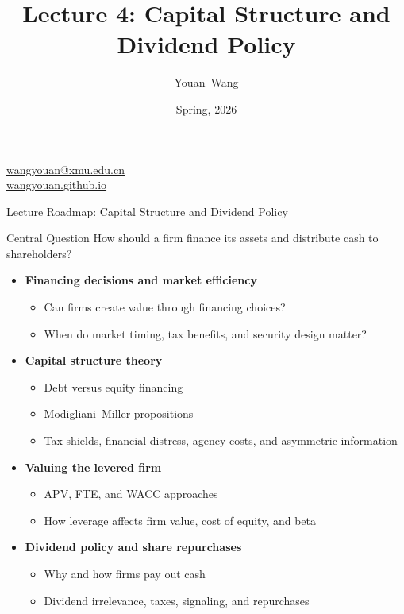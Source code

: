 \documentclass[xcolor=table]{beamer}
\title[csdp]{Lecture 4: Capital Structure and Dividend Policy} %
\author[WYA] %
{Youan~Wang}
\institute[XMU] %
{
    WISE \& SOE, Xiamen University
}
\date[Spring, 2026]{
	Spring, 2026
} %
\begin{document}
\begin{frame}
\titlepage %
\begin{center}
\href{mailto:wangyouan@xmu.edu.cn}{wangyouan@xmu.edu.cn}\\
\href{https://wangyouan.github.io/}{wangyouan.github.io}
\end{center}
\end{frame}

\begin{frame}{Lecture Roadmap: Capital Structure and Dividend Policy}

\begin{block}{Central Question}
How should a firm finance its assets and distribute cash to shareholders?
\end{block}

\begin{itemize}
    \item \textbf{Financing decisions and market efficiency}
    \begin{itemize}
        \item Can firms create value through financing choices?
        \item When do market timing, tax benefits, and security design matter?
    \end{itemize}

    \item \textbf{Capital structure theory}
    \begin{itemize}
        \item Debt versus equity financing
        \item Modigliani--Miller propositions
        \item Tax shields, financial distress, agency costs, and asymmetric information
    \end{itemize}

    \item \textbf{Valuing the levered firm}
    \begin{itemize}
        \item APV, FTE, and WACC approaches
        \item How leverage affects firm value, cost of equity, and beta
    \end{itemize}

    \item \textbf{Dividend policy and share repurchases}
    \begin{itemize}
        \item Why and how firms pay out cash
        \item Dividend irrelevance, taxes, signaling, and repurchases
    \end{itemize}
\end{itemize}


\end{frame}
\end{document}
